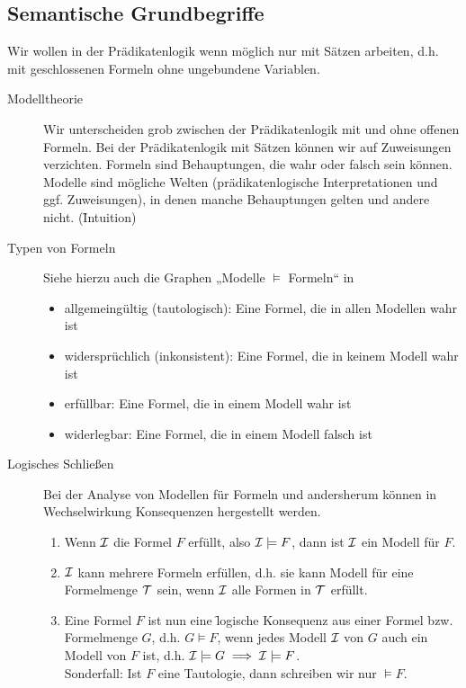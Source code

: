 \subsection{Semantische Grundbegriffe}
    Wir wollen in der Prädikatenlogik wenn möglich nur mit Sätzen arbeiten, d.h. mit geschlossenen Formeln ohne ungebundene Variablen. 
    \begin{description}
        \item[Modelltheorie] Wir unterscheiden grob zwischen der Prädikatenlogik mit und ohne offenen Formeln. Bei der Prädikatenlogik mit Sätzen können wir auf Zuweisungen verzichten. Formeln sind Behauptungen, die wahr oder falsch sein können. Modelle sind mögliche Welten (prädikatenlogische Interpretationen und ggf. Zuweisungen), in denen manche Behauptungen gelten und andere nicht. (\f{Intuition})

        \item[Typen von Formeln]
            Siehe hierzu auch die Graphen „Modelle $\models$ Formeln“ in 
            \begin{itemize}
                \item allgemeingültig (tautologisch): Eine Formel, die in allen Modellen wahr ist
                \item widersprüchlich (inkonsistent): Eine Formel, die in keinem Modell wahr ist
                \item erfüllbar: Eine Formel, die in einem Modell wahr ist
                \item widerlegbar: Eine Formel, die in einem Modell falsch ist
            \end{itemize}

        \item[Logisches Schließen] Bei der Analyse von Modellen für Formeln und andersherum können in Wechselwirkung Konsequenzen hergestellt werden.
            \begin{enumerate}
                \item Wenn $\mathcal{I}$ die Formel $F$ erfüllt, also $\mathcal{I} \models F$, dann ist $\mathcal{I}$ ein Modell für $F$.
                \item $\mathcal{I}$ kann mehrere Formeln erfüllen, d.h. sie kann Modell für eine Formelmenge $\mathcal{T}$ sein, wenn $\mathcal{I}$ alle Formen in $\mathcal{T}$ erfüllt.

                \item Eine Formel $F$ ist nun eine \f{logische Konsequenz} aus einer Formel bzw. Formelmenge $G$, d.h. $G \models F$, wenn jedes Modell $\mathcal{I}$ von $G$ auch ein Modell von $F$ ist, d.h. $\mathcal{I} \models G \implies \mathcal{I} \models F$. \\
                Sonderfall: Ist $F$ eine Tautologie, dann schreiben wir nur $\models F$. \\


\end{enumerate}
\end{description}
